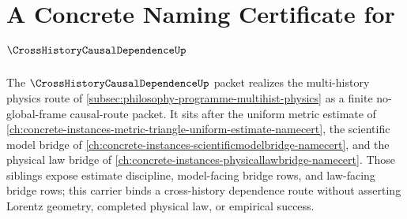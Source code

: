 \chapter{A Concrete Naming Certificate for $\CrossHistoryCausalDependenceUp$}
\label{ch:concrete-instances-crosshistorycausaldependence-namecert}

The $\CrossHistoryCausalDependenceUp$ packet realizes the multi-history physics route of \autoref{subsec:philosophy-programme-multihist-physics} as a finite no-global-frame causal-route packet. It sits after the uniform metric estimate of \autoref{ch:concrete-instances-metric-triangle-uniform-estimate-namecert}, the scientific model bridge of \autoref{ch:concrete-instances-scientificmodelbridge-namecert}, and the physical law bridge of \autoref{ch:concrete-instances-physicallawbridge-namecert}. Those siblings expose estimate discipline, model-facing bridge rows, and law-facing bridge rows; this carrier binds a cross-history dependence route without asserting Lorentz geometry, completed physical law, or empirical success.

